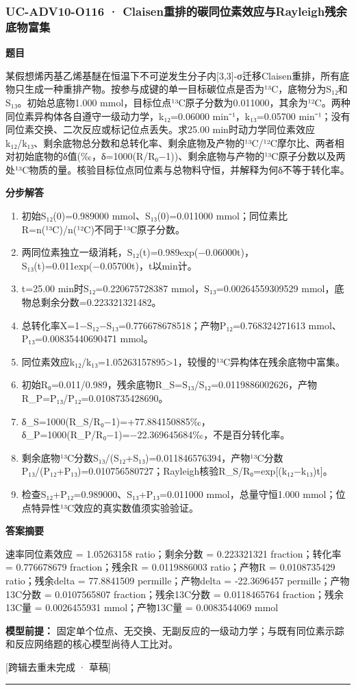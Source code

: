 \documentclass[UTF8,11pt,a4paper]{ctexart}
\begin{document}
\subsubsection*{UC-ADV10-O116 · Claisen重排的碳同位素效应与Rayleigh残余底物富集}
\noindent\textbf{题目}\par
某假想烯丙基乙烯基醚在恒温下不可逆发生分子内[3,3]-σ迁移Claisen重排，所有底物只生成一种重排产物。按参与成键的单一目标碳位点是否为¹³C，底物分为S₁₂和S₁₃。初始总底物1.000 mmol，目标位点¹³C原子分数为0.011000，其余为¹²C。两种同位素异构体各自遵守一级动力学，k₁₂=0.06000 min⁻¹，k₁₃=0.05700 min⁻¹；没有同位素交换、二次反应或标记位点丢失。求25.00 min时动力学同位素效应k₁₂/k₁₃、剩余底物总分数和总转化率、剩余底物及产物的¹³C/¹²C摩尔比、两者相对初始底物的δ值(‰，δ=1000(R/R₀−1))、剩余底物与产物的¹³C原子分数以及两处¹³C物质的量。核验目标位点同位素与总物料守恒，并解释为何δ不等于转化率。\par
\medskip\noindent\textbf{分步解答}
\begin{enumerate}
\item 初始S₁₂(0)=0.989000 mmol、S₁₃(0)=0.011000 mmol；同位素比R=n(¹³C)/n(¹²C)不同于¹³C原子分数。
\item 两同位素独立一级消耗，S₁₂(t)=0.989exp(−0.06000t)，S₁₃(t)=0.011exp(−0.05700t)，t以min计。
\item t=25.00 min时S₁₂=0.220675728387 mmol，S₁₃=0.00264559309529 mmol，底物总剩余分数=0.223321321482。
\item 总转化率X=1−S₁₂−S₁₃=0.776678678518；产物P₁₂=0.768324271613 mmol、P₁₃=0.00835440690471 mmol。
\item 同位素效应k₁₂/k₁₃=1.05263157895>1，较慢的¹³C异构体在残余底物中富集。
\item 初始R₀=0.011/0.989，残余底物R\_S=S₁₃/S₁₂=0.0119886002626，产物R\_P=P₁₃/P₁₂=0.0108735428690。
\item δ\_S=1000(R\_S/R₀−1)=+77.884150885‰，δ\_P=1000(R\_P/R₀−1)=−22.369645684‰，不是百分转化率。
\item 剩余底物¹³C分数S₁₃/(S₁₂+S₁₃)=0.011846576394，产物¹³C分数P₁₃/(P₁₂+P₁₃)=0.010756580727；Rayleigh核验R\_S/R₀=exp[(k₁₂−k₁₃)t]。
\item 检查S₁₂+P₁₂=0.989000、S₁₃+P₁₃=0.011000 mmol，总量守恒1.000 mmol；位点特异性¹³C效应的真实数值须实验验证。
\end{enumerate}
\noindent\textbf{答案摘要}\par
速率同位素效应 = 1.05263158 ratio；剩余分数 = 0.223321321 fraction；转化率 = 0.776678679 fraction；残余R = 0.0119886003 ratio；产物R = 0.0108735429 ratio；残余delta = 77.8841509 permille；产物delta = -22.3696457 permille；产物13C分数 = 0.0107565807 fraction；残余13C分数 = 0.0118465764 fraction；残余13C量 = 0.0026455931 mmol；产物13C量 = 0.0083544069 mmol\par
\noindent\textbf{模型前提：}
固定单个位点、无交换、无副反应的一级动力学；与既有同位素示踪和反应网络题的核心模型尚待人工比对。\par
\noindent\textcolor{red!65!black}{[跨辑去重未完成 · 草稿]} \par
\medskip\hrule\medskip
{}
\end{document}
